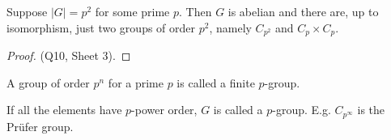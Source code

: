 \begin{corollary}\label{cor:5}
    Suppose $|G| = p^2$ for some prime $p$.
    Then $G$ is abelian and there are, up to isomorphism, just two groups of order $p^2$, namely $C_{p^2}$ and $C_p \times C_p$.
\end{corollary}  

\begin{proof}
    (Q10, Sheet 3).
\end{proof} 

\begin{remark} \mbox{}
    \item A group of order $p^n$ for a prime $p$ is called a finite $p$-group.
    \item If all the elements have $p$-power order, $G$ is called a $p$-group.
    E.g. $C_{p^\infty}$ is the Pr\"ufer group.
\end{remark} 